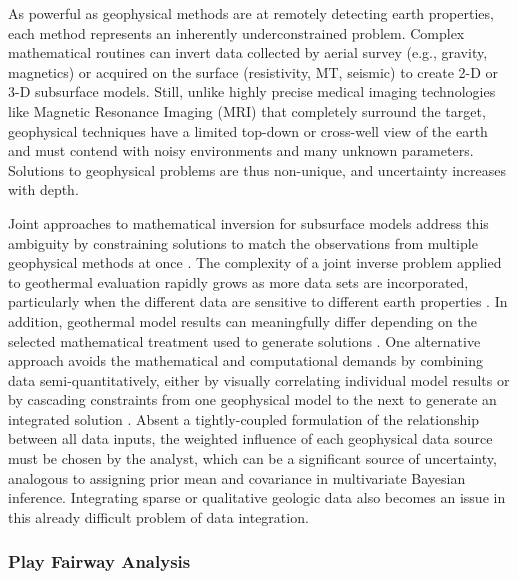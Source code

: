 As powerful as geophysical methods are at remotely detecting earth properties, each method represents an inherently underconstrained problem. Complex mathematical routines can invert data collected by aerial survey (e.g., gravity, magnetics) or acquired on the surface (resistivity, MT, seismic) to create 2-D or 3-D subsurface models. Still, unlike highly precise medical imaging technologies like Magnetic Resonance Imaging (MRI) that completely surround the target, geophysical techniques have a limited top-down or cross-well view of the earth and must contend with noisy environments and many unknown parameters. Solutions to geophysical problems are thus non-unique, and uncertainty increases with depth.

Joint approaches to mathematical inversion for subsurface models address this ambiguity by constraining solutions to match the observations from multiple geophysical methods at once \citep{vozoff_joint_1975}. The complexity of a joint inverse problem applied to geothermal evaluation rapidly grows as more data sets are incorporated, particularly when the different data are sensitive to different earth properties \citep{moorkamp_framework_2011}. In addition, geothermal model results can meaningfully differ depending on the selected mathematical treatment used to generate solutions \citep{rosenkjaer_comparison_2015}. One alternative approach avoids the mathematical and computational demands by combining data semi-quantitatively, either by visually correlating individual model results or by cascading constraints from one geophysical model to the next to generate an integrated solution \citep{jousset_hengill_2011, lichoro_joint_2019}. Absent a tightly-coupled formulation of the relationship between all data inputs, the weighted influence of each geophysical data source must be chosen by the analyst, which can be a significant source of uncertainty, analogous to assigning prior mean and covariance in multivariate Bayesian inference. Integrating sparse or qualitative geologic data also becomes an issue in this already difficult problem of data integration.

\subsubsection{Play Fairway Analysis}\label{ch2:pfa}

